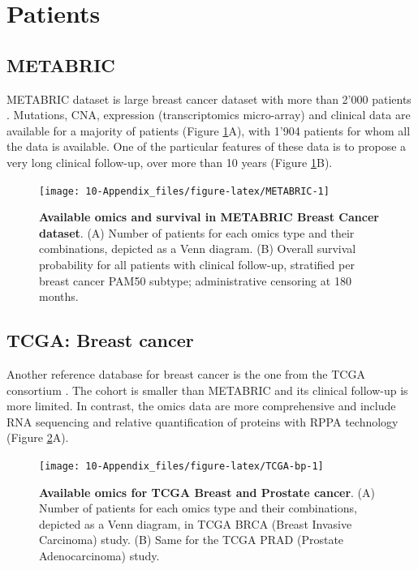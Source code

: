 \documentclass[a4paper,12pt,twoside,onecolumn,openright,final,oldfontcommands]{memoir}
\begin{document}
\section{Patients}\label{appendix-datasets-patients}

\subsection{METABRIC}\label{metabric}

METABRIC dataset is large breast cancer dataset with more than 2'000
patients \citep{pereira2016somatic}. Mutations, CNA, expression
(transcriptomics micro-array) and clinical data are available for a
majority of patients (Figure \ref{fig:METABRIC}A), with 1'904 patients
for whom all the data is available. One of the particular features of
these data is to propose a very long clinical follow-up, over more than
10 years (Figure \ref{fig:METABRIC}B).

\begin{figure}

{\centering \texttt{[image: 10-Appendix\_files/figure-latex/METABRIC-1]} 

}

\caption[Available omics and survival in METABRIC Breast Cancer dataset]{\textbf{Available omics and survival in METABRIC
Breast Cancer dataset}. (A) Number of patients for each omics type and
their combinations, depicted as a Venn diagram. (B) Overall survival
probability for all patients with clinical follow-up, stratified per
breast cancer PAM50 subtype; administrative censoring at 180 months.}\label{fig:METABRIC}
\end{figure}







\subsection{TCGA: Breast cancer}\label{tcga-breast-cancer}

Another reference database for breast cancer is the one from the TCGA
consortium \citep{cancer2012comprehensive}. The cohort is smaller than
METABRIC and its clinical follow-up is more limited. In contrast, the
omics data are more comprehensive and include RNA sequencing and
relative quantification of proteins with RPPA technology (Figure
\ref{fig:TCGA-bp}A).

\begin{figure}

{\centering \texttt{[image: 10-Appendix\_files/figure-latex/TCGA-bp-1]} 

}

\caption[Available omics and survival in METABRIC Breast Cancer dataset]{\textbf{Available omics for TCGA Breast and
Prostate cancer}. (A) Number of patients for each omics type and their
combinations, depicted as a Venn diagram, in TCGA BRCA (Breast Invasive
Carcinoma) study. (B) Same for the TCGA PRAD (Prostate Adenocarcinoma)
study.}\label{fig:TCGA-bp}
\end{figure}
\end{document}
